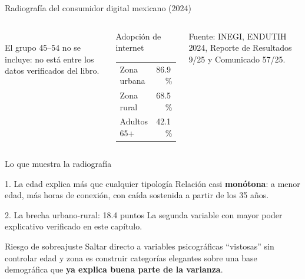 \documentclass[aspectratio=169,xcolor=dvipsnames]{beamer}
\newcommand{\fuente}[1]{{\tiny\color{IPNgris}Fuente: #1}}
\begin{document}
\begin{frame}{Radiografía del consumidor digital mexicano (2024)}
\begin{columns}[c]
  \\
  {\tiny\color{IPNgris}El grupo 45--54 no se incluye: no está entre los datos verificados del libro.}
  \begin{block}{Adopción de internet}
    \small
    \begin{tabular}{@{}lr@{}}
      Zona urbana & 86.9\,\% \\
      Zona rural & 68.5\,\% \\
      Adultos 65+ & 42.1\,\% \\
    \end{tabular}
  \end{block}
  \fuente{INEGI, ENDUTIH 2024, Reporte de Resultados 9/25 y Comunicado 57/25.}
\end{columns}
\end{frame}

\begin{frame}{Lo que muestra la radiografía}
\begin{block}{1. La edad explica más que cualquier tipología}
  \small Relación casi \textbf{monótona}: a menor edad, más horas de conexión, con caída sostenida a partir de los 35 años.
\end{block}
\begin{block}{2. La brecha urbano-rural: 18.4 puntos}
  \small La segunda variable con mayor poder explicativo verificado en este capítulo.
\end{block}
\begin{alertblock}{Riesgo de sobreajuste}
  \small Saltar directo a variables psicográficas \enquote{vistosas} sin controlar edad y zona es construir categorías elegantes sobre una base demográfica que \textbf{ya explica buena parte de la varianza}.
\end{alertblock}
\end{frame}
\end{document}
